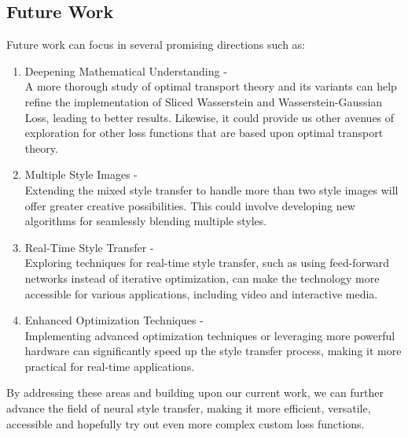 \documentclass[12pt]{article}
\begin{document}
\subsection{Future Work}
Future work can focus in several promising directions such as:
\begin{enumerate}
    \item Deepening Mathematical Understanding -\\
    A more thorough study of optimal transport theory and its variants can help
    refine the implementation of Sliced Wasserstein and Wasserstein-Gaussian
    Loss, leading to better results.  Likewise, it could provide us other
    avenues of exploration for other loss functions that are based upon optimal
    transport theory.
    \item Multiple Style Images -\\
    Extending the mixed style transfer to handle more than two style images will
    offer greater creative possibilities. This could involve developing new
    algorithms for seamlessly blending multiple styles.
    \item Real-Time Style Transfer -\\
    Exploring techniques for real-time style transfer, such as using
    feed-forward networks instead of iterative optimization, can make the
    technology more accessible for various applications, including video and
    interactive media.
    \item Enhanced Optimization Techniques -\\
    Implementing advanced optimization techniques or leveraging more powerful
    hardware can significantly speed up the style transfer process, making it
    more practical for real-time applications.    
\end{enumerate}
By addressing these areas and building upon our current work, we can further
advance the field of neural style transfer, making it more efficient, versatile,
accessible and hopefully try out even more complex custom loss functions.

\newpage
\printbibliography
\end{document}
